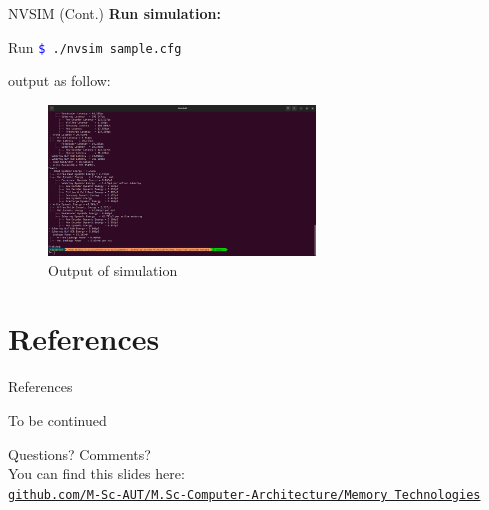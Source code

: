 \documentclass{beamer}
\begin{document}
\begin{frame}{NVSIM (Cont.)}
	\textbf{Run simulation: }
	
	\begin{block}{Run}
		\texttt{\textcolor{blue}{\$} ./nvsim sample.cfg} \\
	\end{block}
	
	output as follow:
	
	\begin{figure}
		\centering
		\includegraphics[height=4cm]{images/img8}
		\caption{Output of simulation}
		\label{fig:Output of simulation}
	\end{figure}
	
\end{frame}






%
%
%
%
%
%
%
%
%
%
%
%
\section{References}

\begin{frame}{References}

\hyperlink{start}{}

\nocite{bibitem1}
\nocite{*}
 


\end{frame}






\begin{frame}[plain]
	\begin{center}
		{\Huge To be continued}
		
		\bigskip\bigskip %
		
		{\LARGE Questions? Comments?}\\
		You can find this slides here:\\
		\textcolor{red}{\href{https://github.com/M-Sc-AUT/M.Sc-Computer-Architecture/tree/main/Memory Technologies}{\texttt{github.com/M-Sc-AUT/M.Sc-Computer-Architecture/Memory Technologies}}}
	\end{center}
\end{frame}
\end{document}
